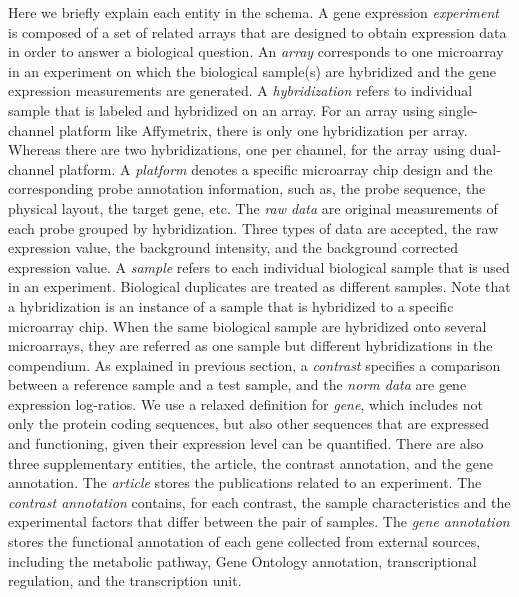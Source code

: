 Here we briefly explain each entity in the schema.
%
A gene expression \textit{experiment} is composed of a set of related arrays
that are designed to obtain expression data in order to answer a biological
question.
%
An \textit{array} corresponds to one microarray in an experiment on which the
biological sample(s) are hybridized and the gene expression measurements are
generated.
%
A \textit{hybridization} refers to individual sample that is labeled and
hybridized on an array.
%
For an array using single-channel platform like Affymetrix, there is only one
hybridization per array.  Whereas there are two hybridizations, one per
channel, for the array using dual-channel platform.
%
A \textit{platform} denotes a specific microarray chip design and the
corresponding probe annotation information, such as, the probe sequence, the
physical layout, the target gene, etc.
%
The \textit{raw data} are original measurements of each probe grouped by
hybridization.  Three types of data are accepted, the raw expression value,
the background intensity, and the background corrected expression value.
%
A \textit{sample} refers to each individual biological sample that is used in
an experiment.  Biological duplicates are treated as different samples.
%
Note that a hybridization is an instance of a sample that is hybridized to a
specific microarray chip.  When the same biological sample are hybridized
onto several microarrays, they are referred as one sample but different
hybridizations in the compendium.
%
%
As explained in previous section, a \textit{contrast} specifies a comparison
between a reference sample and a test sample, and the \textit{norm data} are
gene expression log-ratios.
%
We use a relaxed definition for \textit{gene}, which includes not only the
protein coding sequences, but also other sequences that are expressed and
functioning, given their expression level can be quantified.
%
There are also three supplementary entities, the article, the contrast
annotation, and the gene annotation.
%
The \textit{article} stores the publications related to an experiment.
%
The \textit{contrast annotation} contains, for each contrast, the sample
characteristics and the experimental factors that differ between the pair of
samples.
%
The \textit{gene annotation} stores the functional annotation of each gene
collected from external sources, including the metabolic pathway, Gene Ontology
annotation, transcriptional regulation, and the transcription unit.






